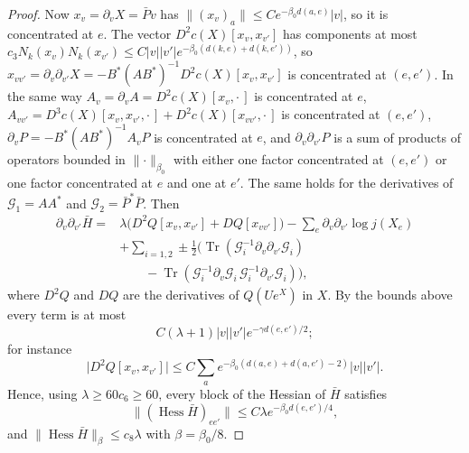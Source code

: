 \documentclass[11pt]{amsart}
\theoremstyle{definition}
\theoremstyle{remark}
\numberwithin{equation}{section}
\newcommand{\Tr}{\operatorname{Tr}}
\begin{document}
\begin{proof}
Now $x_v=\partial_vX=\bar Pv$ has $\lVert(x_v)_a\rVert\le Ce^{-\beta_0
d(a,e)}\lvert v\rvert$, so it is concentrated at $e$. The vector
$D^2c(X)[x_v,x_{v'}]$ has components at most $c_3N_k(x_v)N_k(x_{v'})\le
C\lvert v\rvert\lvert v'\rvert e^{-\beta_0(d(k,e)+d(k,e'))}$, so $x_{vv'}=
\partial_v\partial_{v'}X=-B^*(AB^*)^{-1}D^2c(X)[x_v,x_{v'}]$ is concentrated
at $(e,e')$. In the same way $A_v=\partial_vA=D^2c(X)[x_v,\cdot\,]$ is
concentrated at $e$, $A_{vv'}=D^3c(X)[x_v,x_{v'},\cdot\,]+D^2c(X)[x_{vv'},
\cdot\,]$ is concentrated at $(e,e')$, $\partial_vP=-B^*(AB^*)^{-1}A_vP$ is
concentrated at $e$, and $\partial_v\partial_{v'}P$ is a sum of products of
operators bounded in $\lVert\cdot\rVert_{\beta_0}$ with either one factor
concentrated at $(e,e')$ or one factor concentrated at $e$ and one at $e'$.
The same holds for the derivatives of $\mathcal G_1=AA^*$ and $\mathcal G_2
=\bar P^*\bar P$. Then
\[
\begin{split}
\partial_v\partial_{v'}\bar H={}&\lambda\bigl(D^2Q[x_v,x_{v'}]+DQ[x_{vv'}]
\bigr)-\sum_e\partial_v\partial_{v'}\log j(X_e)\\
&+\sum_{i=1,2}\pm\tfrac12\bigl(\Tr(\mathcal G_i^{-1}\partial_v\partial
_{v'}\mathcal G_i)\\
&\qquad-\Tr(\mathcal G_i^{-1}\partial_v\mathcal G_i\,\mathcal G_i^{-1}
\partial_{v'}\mathcal G_i)\bigr),
\end{split}
\]
where $D^2Q$ and $DQ$ are the derivatives of $Q(Ue^X)$ in $X$. By the
bounds above every term is at most
\[
C(\lambda+1)\lvert v\rvert\lvert v'\rvert e^{-\gamma d(e,e')/2};
\]
for instance
\[
\lvert D^2Q[x_v,x_{v'}]\rvert\le C\sum_ae^{-\beta_0(d(a,e)+d(a,e')-2)}
\lvert v\rvert\lvert v'\rvert.
\]
Hence, using $\lambda\ge60c_6\ge60$, every block of the Hessian of $\bar H$
satisfies
\[
\lVert(\operatorname{Hess}\bar H)_{ee'}\rVert\le C\lambda e^{-\beta_0
d(e,e')/4},
\]
and $\lVert\operatorname{Hess}\bar H\rVert_\beta\le c_8\lambda$ with $\beta
=\beta_0/8$.


\end{proof}
\end{document}
